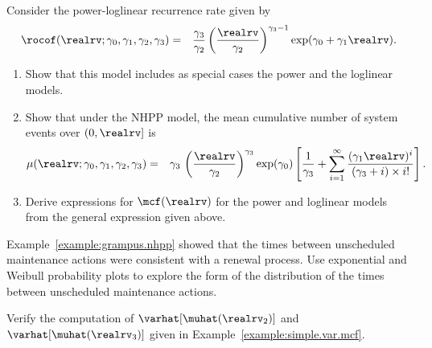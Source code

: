 \begin{exercise}
Consider the 
power-loglinear recurrence rate given by
\begin{eqnarray*}
\rocof(\realrv;\gamma_{0},\gamma_{1},\gamma_{2},\gamma_{3})&=&\frac{\gamma_{3}}
		         {\gamma_{2}} \left ( 	 \frac{\realrv}
{\gamma_{2}} \right )^{\gamma_{3}-1}
\exp(\gamma_{0}+\gamma_{1} \realrv).
\end{eqnarray*}
\begin{enumerate}
\item
Show that this model includes as special cases the power and the
loglinear models.
\item
Show that under the NHPP model, the
mean cumulative number of system events over $(0, \realrv]$ is
\begin{eqnarray*}
\mu(\realrv;\gamma_{0},\gamma_{1}, \gamma_{2},\gamma_{3} )
&=&
\gamma_{3}
\,
\left (
\frac{\realrv}
     {\gamma_{2}}
\right )^{\gamma_{3}}
\exp(\gamma_{0})
\left [
\frac{1}{\gamma_{3}}
+ 
\sum_{i=1}^{\infty}
\frac{
 (\gamma_{1} \realrv)^{i}
     }
     {
(\gamma_{3}+i) \times i!
     }
\right ].
\end{eqnarray*}
\item
Derive expressions for $\mcf(\realrv)$ for the 
power and loglinear models from the general expression
given above.
\end{enumerate}
\end{exercise}

\begin{exercise}
\label{exercise:grampus.renewal.dist}
Example~\ref{example:grampus.nhpp} showed that the times
between unscheduled 
maintenance actions were consistent with a renewal process.
Use exponential and Weibull probability plots to explore the
form of the distribution of the times
between unscheduled 
maintenance actions.
\end{exercise}

\begin{exercise}
Verify the computation of 
$\varhat[\muhat(\realrv_{2})]$ and $\varhat[\muhat(\realrv_{3})]$
given in Example~\ref{example:simple.var.mcf}.
\end{exercise}

